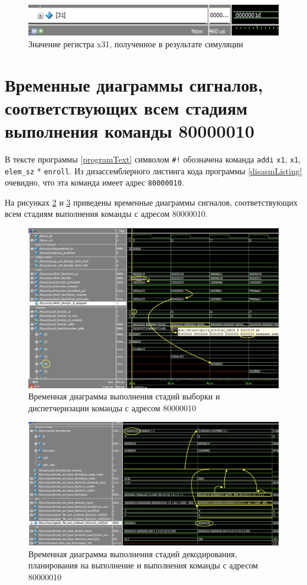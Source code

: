 \documentclass[12pt]{report}
\begin{document}
\begin{figure}[h!p]
	\centering
	\includegraphics[width = \linewidth]{x31check.png}
	\caption{Значение регистра x31, полученное в результате симуляции}
	\label{x31check}
\end{figure}

\section{Временные диаграммы сигналов, соответствующих всем стадиям выполнения команды 80000010}
В тексте программы \ref{programText} символом \verb|#!| обозначена команда \verb|addi| \verb|x1|, \verb|x1|, \verb|elem_sz| * \verb|enroll|. Из дизассемблерного листинга кода программы \ref{disasmListing} очевидно, что эта команда имеет адрес \verb|80000010|.

На рисунках \ref{80000010_01} и \ref{80000010_02} приведены временные диаграммы сигналов, соответствующих всем стадиям выполнения команды с адресом 80000010.
\begin{figure}[h!p]
	\centering
	\includegraphics[width = \linewidth]{80000010_01.png}
	\caption{Временная диаграмма выполнения стадий выборки и диспетчеризации команды с адресом 80000010}
	\label{80000010_01}
\end{figure}

\begin{figure}[h!p]
	\centering
	\includegraphics[width = \linewidth]{80000010_02.png}
	\caption{Временная диаграмма выполнения стадий декодирования, планирования на выполнение и выполнения команды с адресом 80000010}
	\label{80000010_02}
\end{figure}
\newpage
\end{document}
